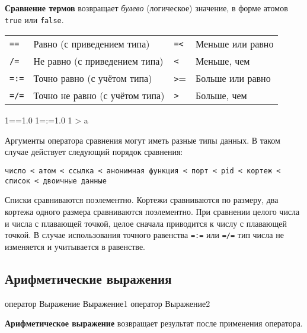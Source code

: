 \textbf{Сравнение термов} возвращает \emph{булево} (логическое) значение, в 
форме атомов \texttt{true} или \texttt{false}.

\begin{center}
\begin{tabular}{|>{\raggedright}p{40pt}|>{\raggedright}p{185pt}|>{\raggedright}p{26pt}|>{\raggedright}p{135pt}|}
\hline
\multicolumn{4}{|p{297pt}|}{Операторы сравнения}\tabularnewline
\hline
\texttt{==} & Равно (с приведением типа) &
\texttt{=<} & Меньше или равно \tabularnewline
\hline
\texttt{/=} & Не равно (с приведением типа) &
\texttt{<} & Меньше, чем \tabularnewline
\hline
\texttt{=:=} & Точно равно (с учётом типа) &
\texttt{>}= & Больше или равно \tabularnewline
\hline
\texttt{=/=} & Точно не равно (с учётом типа) &
\texttt{>} & Больше, чем \tabularnewline
\hline
\end{tabular}
\end{center}

\begin{erlang}
1==1.0              %
1=:=1.0             %
1 > a               %
\end{erlang}

Аргументы оператора сравнения могут иметь разные типы данных. В таком случае 
действует следующий порядок сравнения:

\texttt{число < атом < ссылка < анонимная функция < порт < pid < кортеж < 
	список < двоичные данные}

Списки сравниваются поэлементно. Кортежи сравниваются по размеру, два кортежа 
одного размера сравниваются поэлементно. При сравнении целого числа и числа с 
плавающей точкой, целое сначала приводится к числу с плавающей точкой. В случае 
использования точного равенства \texttt{=:=} или \texttt{=/=} тип числа не 
изменяется и учитывается в равенстве.


\subsection{Арифметические выражения}

\begin{erlangru}
оператор Выражение
Выражение1 оператор Выражение2
\end{erlangru}

\textbf{Арифметическое выражение} возвращает результат после применения 
оператора.

